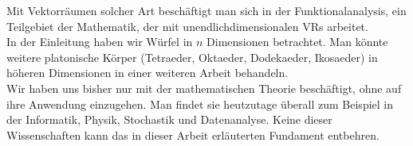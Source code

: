 Mit Vektorräumen solcher Art beschäftigt man sich in der Funktionalanalysis, ein Teilgebiet der Mathematik, der mit unendlichdimensionalen \aclp{VR} arbeitet.
\\ In der Einleitung haben wir Würfel in $n$ Dimensionen betrachtet. Man könnte weitere platonische Körper (Tetraeder, Oktaeder, Dodekaeder, Ikosaeder) in höheren Dimensionen in einer weiteren Arbeit behandeln. 
\\ Wir haben uns bisher nur mit der mathematischen Theorie beschäftigt, ohne auf ihre Anwendung einzugehen. Man findet sie heutzutage überall zum Beispiel in der Informatik, Physik, Stochastik und Datenanalyse. Keine dieser Wissenschaften kann das in dieser Arbeit erläuterten Fundament entbehren. 